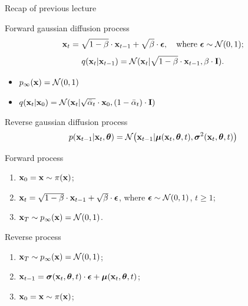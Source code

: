 \begin{frame}{Recap of previous lecture}
	\begin{block}{Forward gaussian diffusion process}
		\vspace{-0.4cm}
		\[
			\mathbf{x}_t = \sqrt{1 - \beta} \cdot \mathbf{x}_{t - 1} + \sqrt{\beta} \cdot \boldsymbol{\epsilon}, \quad \text{where }\boldsymbol{\epsilon} \sim \mathcal{N}(0, 1);
		\]
		\[
			q(\mathbf{x}_t | \mathbf{x}_{t-1}) = \mathcal{N}(\mathbf{x}_t | \sqrt{1 - \beta} \cdot \mathbf{x}_{t-1}, \beta \cdot \mathbf{I}).
		\]
		\vspace{-0.7cm}
	\end{block}
	\begin{itemize}
		\item $p_{\infty}(\mathbf{x}) = \mathcal{N}(0, 1)$
		\item $q(\mathbf{x}_t | \mathbf{x}_0) = \mathcal{N}(\mathbf{x}_t | \sqrt{\bar{\alpha}_t} \cdot \mathbf{x}_0, (1 - \bar{\alpha}_t) \cdot \mathbf{I})$
	\end{itemize}
	\begin{block}{Reverse gaussian diffusion process}
		\vspace{-0.2cm}
		\[
			p(\mathbf{x}_{t - 1} | \mathbf{x}_t, \boldsymbol{\theta}) = \mathcal{N} \bigl(\mathbf{x}_{t - 1} | \boldsymbol{\mu}(\mathbf{x}_t, \boldsymbol{\theta}, t), \boldsymbol{\sigma}^2(\mathbf{x}_t, \boldsymbol{\theta}, t)\bigr)
		\]
		\vspace{-0.5cm}
	\end{block}
	\begin{minipage}{0.5\linewidth}
		\begin{block}{Forward process}
			\begin{enumerate}
				\item $\mathbf{x}_0 = \mathbf{x} \sim \pi(\mathbf{x})$;
				\item $\mathbf{x}_t = \sqrt{1 - \beta} \cdot \mathbf{x}_{t - 1} + \sqrt{\beta} \cdot \boldsymbol{\epsilon}$, where $\boldsymbol{\epsilon} \sim \mathcal{N}(0, 1)$, $t \geq 1$;
				\item $\mathbf{x}_T \sim p_{\infty}(\mathbf{x}) = \mathcal{N}(0, 1)$.
			\end{enumerate}
		\end{block}
	\end{minipage}%
	\begin{minipage}{0.5\linewidth}
		\begin{block}{Reverse process}
			\begin{enumerate}
				\item $\mathbf{x}_T \sim p_{\infty}(\mathbf{x}) = \mathcal{N}(0, 1)$;
				\item $\mathbf{x}_{t - 1} = \boldsymbol{\sigma}(\mathbf{x}_t, \boldsymbol{\theta}, t) \cdot \boldsymbol{\epsilon} + \boldsymbol{\mu}(\mathbf{x}_t, \boldsymbol{\theta}, t)$;
				\item $\mathbf{x}_0 = \mathbf{x} \sim \pi(\mathbf{x})$;
			\end{enumerate}
		\end{block}
	\end{minipage}
\end{frame}
